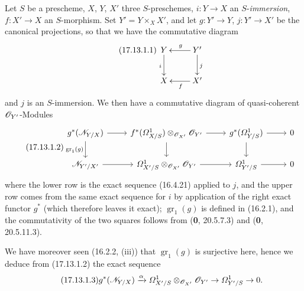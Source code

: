 \begin{env}[17.13.1]
\label{IV.17.13.1}
Let $S$ be a prescheme, $X$, $Y$, $X'$ three $S$-preschemes, $i:Y\to X$ an $S$-\emph{immersion}, $f:X'\to X$ an $S$-morphism. Set $Y'=Y\times_XX'$, and let $g:Y'\to Y$, $j:Y'\to X'$ be the canonical projections, so that we have the commutative diagram
\[
\label{IV.17.13.1.1}
\tag{17.13.1.1}
\xymatrix{
  Y \ar[d]_i & Y' \ar[l]_g \ar[d]^j\\
  X & X' \ar[l]^f
}
\]
and $j$ is an $S$-immersion. We then have a commutative diagram of quasi-coherent $\mathscr{O}_{Y'}$-Modules
\[
\label{IV.17.13.1.2}
\tag{17.13.1.2}
\begin{tikzcd}
  g^*(\sh{N}_{Y/X}) \ar{r} \ar{d}[swap]{\operatorname{gr}_1(g)} & f^*(\varOmega^1_{X/S})\otimes_{\sh{O}_{X'}}\sh{O}_{Y'} \ar{r} \ar{d} & g^*(\varOmega^1_{Y/S}) \ar{r} \ar{d} & 0\\
  \sh{N}_{Y'/X'} \ar{r} & \varOmega^1_{X'/S}\otimes_{\sh{O}_{X'}}\sh{O}_{Y'} \ar{r} & \varOmega^1_{Y'/S} \ar{r} & 0
\end{tikzcd}
\]
where the lower row is the exact sequence (16.4.21) applied to $j$, and the upper row comes from the same exact sequence for $i$ by application of the right exact functor $g^*$ (which therefore leaves it exact); $\operatorname{gr}_1(g)$ is defined in (16.2.1), and the commutativity of the two squares follows from (\textbf{0}, 20.5.7.3) and (\textbf{0}, 20.5.11.3).


We have moreover seen (16.2.2, (iii)) that $\operatorname{gr}_1(g)$ is surjective here, hence we deduce from (17.13.1.2) the exact sequence
\[
\label{IV.17.13.1.3}
\tag{17.13.1.3}
g^*(\mathscr{N}_{Y/X})\xrightarrow{\alpha}\varOmega^1_{X'/S}\otimes_{\mathscr{O}_{X'}}\mathscr{O}_{Y'}\to\varOmega^1_{Y'/S}\to0.
\]
\end{env}

